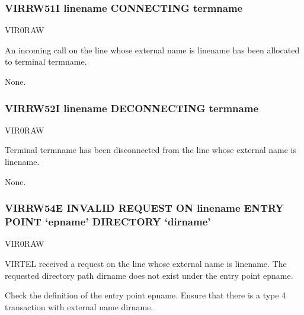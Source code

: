 \documentclass[letterpaper,10pt,english]{sphinxmanual}
\begin{document}
\subsubsection{VIRRW51I linename CONNECTING termname}
\label{\detokenize{messages:virrw51i-linename-connecting-termname}}\begin{description}
\sphinxAtStartPar
VIR0RAW

\sphinxAtStartPar
An incoming call on the line whose external name is linename has been allocated to terminal termname.

\sphinxAtStartPar
None.

\end{description}


\subsubsection{VIRRW52I linename DECONNECTING termname}
\label{\detokenize{messages:virrw52i-linename-deconnecting-termname}}\begin{description}
\sphinxAtStartPar
VIR0RAW

\sphinxAtStartPar
Terminal termname has been disconnected from the line whose external name is linename.

\sphinxAtStartPar
None.

\end{description}


\subsubsection{VIRRW54E INVALID REQUEST ON linename ENTRY POINT ‘epname’ DIRECTORY ‘dirname’}
\label{\detokenize{messages:virrw54e-invalid-request-on-linename-entry-point-epname-directory-dirname}}\begin{description}
\sphinxAtStartPar
VIR0RAW

\sphinxAtStartPar
VIRTEL received a request on the line whose external name is linename. The requested directory path dirname does not exist under the entry point epname.

\sphinxAtStartPar
Check the definition of the entry point epname. Ensure that there is a type 4 transaction with external name dirname.

\end{description}
\end{document}
